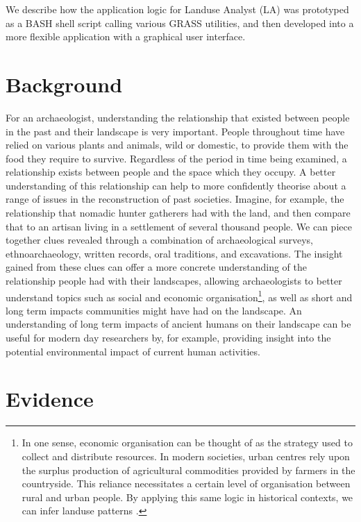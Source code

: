 We describe how the application logic for Landuse Analyst (LA) was prototyped
as a BASH shell script calling various GRASS utilities, and then developed into
a more flexible application with a graphical user interface.

\section{Background} 

For an archaeologist, understanding the relationship that existed between
people in the past and their landscape is very important.  People throughout
time have relied on various plants and animals, wild or domestic, to provide
them with the food they require to survive.  Regardless of the period in time
being examined, a relationship exists between people and the space which they
occupy.  A better understanding of this relationship can help to more
confidently theorise about a range of issues in the reconstruction of past
societies.  Imagine, for example, the relationship that nomadic hunter
gatherers had with the land, and then compare that to  an artisan living in a
settlement of several thousand people.  We can piece together clues revealed
through a combination of archaeological surveys, ethnoarchaeology, written
records, oral traditions, and excavations. The insight gained from these clues
can offer a more concrete understanding of the relationship people had with
their landscapes, allowing archaeologists to better understand topics such as
social and economic organisation\footnote{In one sense, economic organisation
can be thought of as the strategy used to collect and distribute resources.  In
modern societies, urban centres rely upon the surplus production of
agricultural commodities provided by farmers in the countryside.  This reliance
necessitates a certain level of organisation between rural and urban people.
By applying this same logic in historical contexts, we can infer landuse
patterns .}, as well as short and long term impacts communities might have had
on the landscape.  An understanding of long term impacts of ancient humans on
their landscape can be useful for modern day researchers by, for example,
providing insight into the potential environmental impact of current human
activities.

\section{Evidence} \label{sec:Evidence} 

